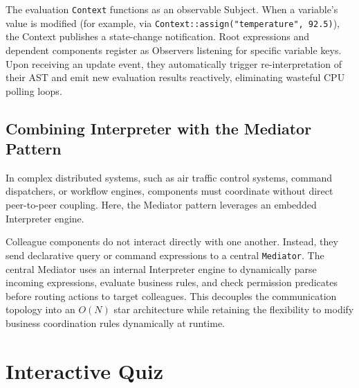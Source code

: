 \documentclass[12pt,a4paper]{article}
\begin{document}
The evaluation \texttt{Context} functions as an observable Subject. When a variable's value is modified (for example, via \texttt{Context::assign("temperature", 92.5)}), the Context publishes a state-change notification. Root expressions and dependent components register as Observers listening for specific variable keys. Upon receiving an update event, they automatically trigger re-interpretation of their AST and emit new evaluation results reactively, eliminating wasteful CPU polling loops.

\subsection{Combining Interpreter with the Mediator Pattern}
In complex distributed systems, such as air traffic control systems, command dispatchers, or workflow engines, components must coordinate without direct peer-to-peer coupling. Here, the Mediator pattern leverages an embedded Interpreter engine.

Colleague components do not interact directly with one another. Instead, they send declarative query or command expressions to a central \texttt{Mediator}. The central Mediator uses an internal Interpreter engine to dynamically parse incoming expressions, evaluate business rules, and check permission predicates before routing actions to target colleagues. This decouples the communication topology into an $O(N)$ star architecture while retaining the flexibility to modify business coordination rules dynamically at runtime.

\section{Interactive Quiz}
\end{document}

